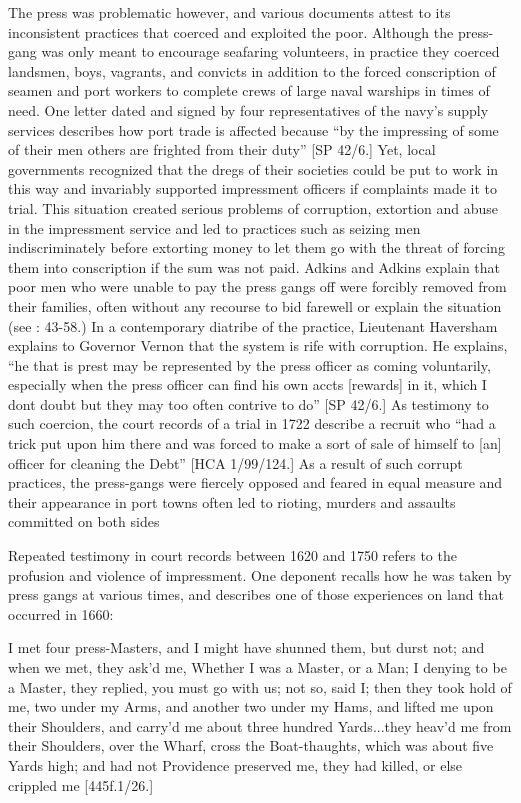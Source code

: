 The press was problematic however, and various documents attest to its inconsistent practices that coerced and exploited the poor. Although the press-gang was only meant to encourage seafaring volunteers, in practice they coerced landsmen, boys, vagrants, and convicts in addition to the forced conscription of seamen and port workers to complete crews of large naval warships in times of need. One letter dated \citealt{March1700} and signed by four representatives of the navy’s supply services describes how port trade is affected because “by the impressing of some of their men others are frighted from their duty” [SP 42/6.] Yet, local governments recognized that the dregs of their societies could be put to work in this way and invariably supported impressment officers if complaints made it to trial. This situation created serious problems of corruption, extortion and abuse in the impressment service and led to practices such as seizing men indiscriminately before extorting money to let them go with the threat of forcing them into conscription if the sum was not paid. Adkins and Adkins explain that poor men who were unable to pay the press gangs off were forcibly removed from their families, often without any recourse to bid farewell or explain the situation (see \citealt{AdkinsAdkins2008}: 43-58.) In a contemporary diatribe of the practice, Lieutenant Haversham explains to Governor Vernon that the system is rife with corruption. He explains, “he that is prest may be represented by the press officer as coming voluntarily, especially when the press officer can find his own accts [rewards] in it, which I dont doubt but they may too often contrive to do” [SP 42/6.] As testimony to such coercion, the court records of a trial in 1722 describe a recruit who “had a trick put upon him there and was forced to make a sort of sale of himself to [an] officer for cleaning the Debt” [HCA 1/99/124.] As a result of such corrupt practices, the press-gangs were fiercely opposed and feared in equal measure and their appearance in port towns often led to rioting, murders and assaults committed on both sides 

Repeated testimony in court records between 1620 and 1750 refers to the profusion and violence of impressment. One deponent recalls how he was taken by press gangs at various times, and describes one of those experiences on land that occurred in 1660:

I met four press-Masters, and I might have shunned them, but durst not; and when we met, they ask’d me, Whether I was a Master, or a Man; I denying to be a Master, they replied, you must go with us; not so, said I; then they took hold of me, two under my Arms, and another two under my Hams, and lifted me upon their Shoulders, and carry’d me about three hundred Yards...they heav’d me from their Shoulders, over the Wharf, cross the Boat-thaughts, which was about five Yards high; and had not Providence preserved me, they had killed, or else crippled me [445f.1/26.]

